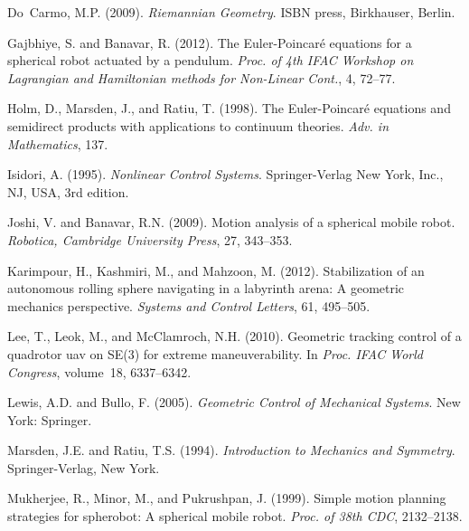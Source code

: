 \documentclass{ifacconf}
\begin{document}
\begin{thebibliography}{26}
Do~Carmo, M.P. (2009).
\newblock \emph{Riemannian Geometry}.
\newblock ISBN press, Birkhauser, Berlin.

Gajbhiye, S. and Banavar, R. (2012).
\newblock The {E}uler-{P}oincar\'{e} equations for a spherical robot actuated
  by a pendulum.
\newblock \emph{Proc. of 4th IFAC Workshop on Lagrangian and Hamiltonian
  methods for Non-Linear Cont.}, 4, 72--77.

Holm, D., Marsden, J., and Ratiu, T. (1998).
\newblock The {E}uler-{P}oincar\'{e} equations and semidirect products with
  applications to continuum theories.
\newblock \emph{Adv. in Mathematics}, 137.

Isidori, A. (1995).
\newblock \emph{Nonlinear Control Systems}.
\newblock Springer-Verlag New York, Inc., NJ, USA, 3rd edition.

Joshi, V. and Banavar, R.N. (2009).
\newblock Motion analysis of a spherical mobile robot.
\newblock \emph{Robotica, Cambridge University Press}, 27, 343--353.

Karimpour, H., Kashmiri, M., and Mahzoon, M. (2012).
\newblock Stabilization of an autonomous rolling sphere navigating in a
  labyrinth arena: A geometric mechanics perspective.
\newblock \emph{Systems and Control Letters}, 61, 495--505.

Lee, T., Leok, M., and McClamroch, N.H. (2010).
\newblock Geometric tracking control of a quadrotor uav on {SE}(3) for extreme
  maneuverability.
\newblock In \emph{Proc. IFAC World Congress}, volume~18, 6337--6342.

Lewis, A.D. and Bullo, F. (2005).
\newblock \emph{Geometric Control of Mechanical Systems}.
\newblock New York: Springer.

Marsden, J.E. and Ratiu, T.S. (1994).
\newblock \emph{Introduction to Mechanics and Symmetry}.
\newblock Springer-Verlag, New York.

Mukherjee, R., Minor, M., and Pukrushpan, J. (1999).
\newblock Simple motion planning strategies for spherobot: A spherical mobile
  robot.
\newblock \emph{Proc. of 38th CDC}, 2132--2138.


\end{thebibliography}
\end{document}
